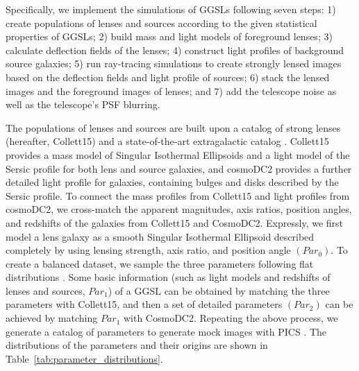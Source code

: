 \documentclass[12pt, twocolumn, apj]{openjournal}
\begin{document}
Specifically, we implement the simulations of GGSLs following seven steps: 1) create populations of lenses and sources according to the given statistical properties of GGSLs; 2) build mass and light models of foreground lenses; 3) calculate deflection fields of the lenses; 4) construct light profiles of background source galaxies; 5) run ray-tracing simulations to create strongly lensed images based on the deflection fields and light profile of sources; 6) stack the lensed images and the foreground images of lenses; and 7) add the telescope noise as well as the telescope's PSF blurring.

The populations of lenses and sources are built upon a catalog of strong lenses \citep{Collett2015} (hereafter, Collett15) and a state-of-the-art extragalactic catalog \citep{CosmoDC2}. Collett15 provides a mass model of Singular Isothermal Ellipsoids \citep[SIEs][]{Kormann1994} and a light model of the Sersic profile \citep{Sersic1968} for both lens and source galaxies, and cosmoDC2 provides a further detailed light profile for galaxies, containing bulges and disks described by the Sersic profile. To connect the mass profiles from Collett15 and light profiles from cosmoDC2, we cross-match the apparent magnitudes, axis ratios, position angles, and redshifts of the galaxies from Collett15 and CosmoDC2. Expressly, we first model a lens galaxy as a smooth Singular Isothermal Ellipsoid described completely by using lensing strength, axis ratio, and position angle $(Par_{0})$. To create a balanced dataset, we sample the three parameters following flat distributions \citep{Pearson2019}. Some basic information (such as light models and redshifts of lenses and sources, $Par_{1}$) of a GGSL can be obtained by matching the three parameters with Collett15, and then a set of detailed parameters $(Par_2)$ can be achieved by matching $Par_1$ with CosmoDC2. Repeating the above process, we generate a catalog of parameters to generate mock images with PICS \citep{PICS}. The distributions of the parameters and their origins are shown in Table~\ref{tab:parameter_distributions}.
\end{document}
